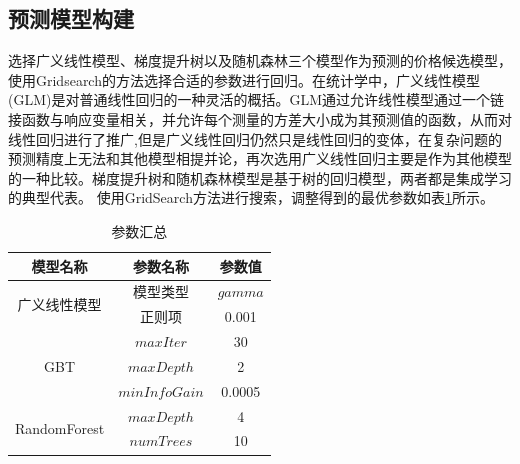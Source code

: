 \documentclass{article}
\begin{document}
\subsection{预测模型构建}
选择广义线性模型、梯度提升树以及随机森林三个模型作为预测的价格候选模型，使用Gridsearch的方法选择合适的参数进行回归。在统计学中，广义线性模型(GLM)是对普通线性回归的一种灵活的概括。GLM通过允许线性模型通过一个链接函数与响应变量相关，并允许每个测量的方差大小成为其预测值的函数，从而对线性回归进行了推广\cite{ContributorstoWikimediaprojects2022Jan},但是广义线性回归仍然只是线性回归的变体，在复杂问题的预测精度上无法和其他模型相提并论，再次选用广义线性回归主要是作为其他模型的一种比较。梯度提升树和随机森林模型是基于树的回归模型，两者都是集成学习的典型代表。
使用GridSearch方法进行搜索，调整得到的最优参数如表\ref{tab:参数汇总}所示。
\begin{table}[!htpb]
	\centering 
	\begin{tabular}{|c|cc|}
		\hline 
		模型名称 & 参数名称 & 参数值 \\\hline 
		\multirow{2}{*}{广义线性模型} & 模型类型 & $gamma$\\  
		& 正则项 & 0.001 \\\hline 
		\multirow{3}{*}{GBT} & $maxIter$ & 30 \\
		& $maxDepth$ & 2\\
		& $minInfoGain$ & 0.0005\\\hline
		\multirow{2}{*}{RandomForest}
		& $maxDepth$ & 4\\
		& $numTrees$ &10 \\\hline 

	\end{tabular}
	\caption{参数汇总}
	\label{tab:参数汇总}
\end{table}
\end{document}
